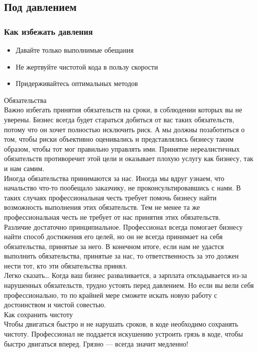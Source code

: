 \documentclass{../industrial-development}
\begin{document}
\subsection{Под давлением}
\begin{frame} \frametitle{Как избежать давления}
\begin{itemize}
  \item Давайте только выполнимые обещания
  \item Не жертвуйте чистотой кода в пользу скорости
	\item Придерживайтесь оптимальных методов
\end{itemize}
\end{frame}
\lecturenotes
Обязательства\\
Важно избегать принятия обязательств на сроки, в соблюдении которых вы не уверены. Бизнес всегда будет стараться добиться от вас таких обязательств, потому что он хочет полностью исключить риск. А мы должны позаботиться о том, чтобы риски объективно оценивались и  представлялись бизнесу таким образом, чтобы тот мог правильно управлять ими. Принятие нереалистичных обязательств противоречит этой цели и оказывает плохую услугу как бизнесу, так и нам самим.\\
Иногда обязательства принимаются за нас. Иногда мы вдруг узнаем, что начальство что-то пообещало заказчику, не проконсультировавшись с нами. В таких случаях профессиональная честь требует помочь бизнесу найти возможность выполнения этих обязательств. Тем не менее та же профессиональная честь не требует от нас принятия этих обязательств.\\
Различие достаточно принципиальное. Профессионал всегда помогает бизнесу найти способ достижения его целей, но он не всегда принимает на себя обязательства, принятые за него. В конечном итоге, если нам не удастся выполнить обязательства, принятые за нас, то ответственность за это должен нести тот, кто эти обязательства принял.\\
Легко сказать… Когда ваш бизнес разваливается, а зарплата откладывается из-за нарушенных обязательств, трудно устоять перед давлением. Но если вы вели себя профессионально, то по крайней мере сможете искать новую работу с достоинством и чистой совестью.\\
Как сохранить чистоту\\
Чтобы двигаться быстро и не нарушать сроков, в коде необходимо сохранять чистоту. Профессионал не поддается искушению устроить грязь в коде, чтобы быстро двигаться вперед. Грязно — всегда значит медленно!\\
\end{document}
